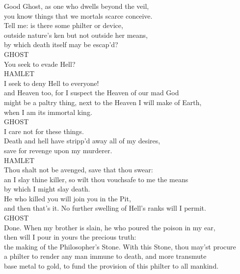 \noindent{}Good Ghost, as one who dwells beyond the veil,\\
you know things that we mortals scarce conceive.\\
Tell me: is there some philter or device,\\
outside nature's ken but not outside her means,\\
by which death itself may be escap'd?\\

\noindent{}GHOST\\
You seek to evade Hell?\\

\noindent{}HAMLET\\
I seek to deny Hell to everyone!\\
and Heaven too, for I suspect the Heaven of our mad God\\
might be a paltry thing, next to the Heaven I will make of Earth,\\
when I am its immortal king.\\

\noindent{}GHOST\\
I care not for these things.\\
Death and hell have stripp'd away all of my desires,\\
save for revenge upon my murderer.\\

\noindent{}HAMLET\\
Thou shalt not be avenged, save that thou swear:\\
an I slay thine killer, so wilt thou vouchsafe to me the means\\
by which I might slay death.\\

\noindent{}He who killed you will join you in the Pit,\\
and then that's it. No further swelling of Hell's ranks will I permit.\\

\noindent{}GHOST\\
Done. When my brother is slain, he who poured the poison in my ear,\\
then will I pour in yours the precious truth:\\
the making of the Philosopher's Stone. With this Stone, thou may'st procure\\
a philter to render any man immune to death, and more transmute\\
base metal to gold, to fund the provision of this philter to all mankind.\\

